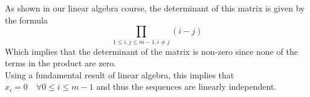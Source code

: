 \documentclass[11pt, a4paper]{article}
\begin{document}
As shown in our linear algebra course, the determinant of this matrix is given by the formula
\[ 
	\prod_{1\leq i,j \leq m-1, i \neq j} ( i-j) 
\]
Which implies that the determinant of the matrix is non-zero since none of the terms in the product are zero.\\
Using a fundamental result of linear algebra, this implies that $x_i = 0 \quad \forall 0\leq i \leq m-1$ and thus the sequences are linearly independent.













\end{document}

